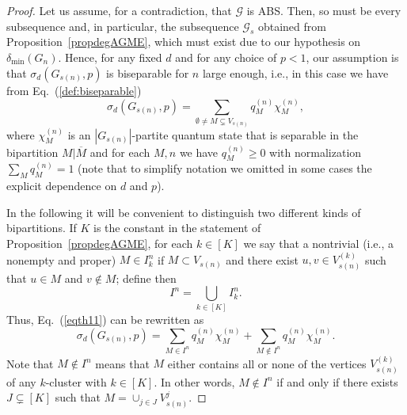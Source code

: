 \documentclass[a4paper,onecolumn,accepted=2024-12-14]{quantumarticle}
\theoremstyle{plain}
\newcommand{\cG}{{\mathcal G}}         %
\begin{document}
\begin{proof}
Let us assume, for a contradiction, that $\cG$ is ABS. Then, so must be every subsequence and, in particular, the subsequence $\cG_s$ obtained from Proposition~\ref{propdegAGME}, which must exist due to our hypothesis on $\delta_{\mathrm{min}}(G_n)$. Hence, for any fixed $d$ and for any choice of $p<1$, our assumption is that $\sigma_d(G_{s(n)},p)$ is biseparable for $n$ large enough, i.e., in this case we have from Eq.~(\ref{def:biseparable})
\begin{equation}\label{eqth11}
\sigma_d(G_{s(n)},p)=\sum_{\emptyset\neq M\subsetneq V_{s(n)}}q_M^{(n)}\chi_M^{(n)},
\end{equation}
where $\chi_M^{(n)}$ is an $|G_{s(n)}|$-partite quantum state that is separable in the bipartition $M|\overline{M}$ and for each $M,n$ we have $q_M^{(n)}\geq0$ with normalization $\sum_Mq_M^{(n)}=1$ (note that to simplify notation we omitted in some cases the explicit dependence on $d$ and $p$).

In the following it will be convenient to distinguish two different kinds of bipartitions. If $K$ is the constant in the statement of Proposition~\ref{propdegAGME},  for each $k\in [K]$ we say that a nontrivial (i.e., a nonempty and
proper) $M\in I_k^n$ if $M\subset V_{s(n)}$ and there exist $u,v\in V_{s(n)}^{(k)}$ such that $u\in M$ and $v\notin M$; define then
\begin{equation}\label{eq:Ik}
I^n=\bigcup_{k\in[K]}I^n_k.
\end{equation}
Thus, Eq.~(\ref{eqth11}) can be rewritten as
\begin{equation}\label{eqth11bis}
\sigma_d(G_{s(n)},p)=\sum_{M\in I^n}q_M^{(n)}\chi_M^{(n)}+\sum_{M\notin I^n}q_M^{(n)}\chi_M^{(n)}.
\end{equation}
Note that $M\notin I^n$ means that $M$ either contains all or none of the vertices
$V_{s(n)}^{(k)}$ of any $k$-cluster with $k\in [K]$. In other words, $M\notin I^n$ if and only if there exists $J\subsetneq [K]$ such that $M=\cup_{j\in J}V_{s(n)}^j$.



\end{proof}
\end{document}

